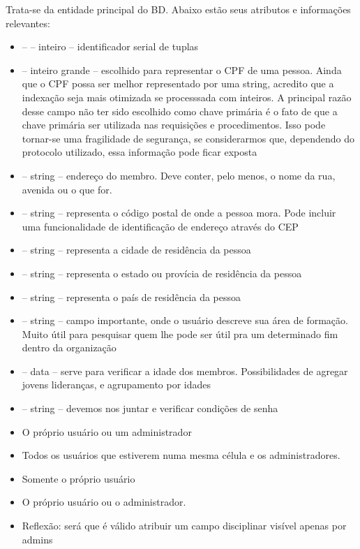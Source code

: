 \documentclass[11pt]{article}
\begin{document}
            Trata-se da entidade principal do BD. Abaixo estão seus atributos e informações
            relevantes:
            \begin{itemize}
                \item \pk --  -- inteiro -- identificador serial de tuplas
                \item {} -- inteiro grande -- escolhido para representar o CPF
                de uma pessoa. Ainda que o CPF possa ser melhor representado por uma string,
                acredito que a indexação seja mais otimizada se processsada com inteiros.
                A principal razão desse campo não ter sido escolhido como chave primária
                é o fato de que a chave primária ser utilizada nas requisições e procedimentos.
                Isso pode tornar-se uma fragilidade de segurança, se considerarmos que, dependendo
                do protocolo utilizado, essa informação pode ficar exposta
                \item {} -- string -- endereço do membro. Deve conter, pelo
                menos, o nome da rua, avenida ou o que for.
                \item {} -- string -- representa o código postal de onde a pessoa
                mora. Pode incluir uma funcionalidade de identificação de endereço através do CEP
                \item {} -- string -- representa a cidade de residência da pessoa
                \item {} -- string -- representa o estado ou provícia de residência
                da pessoa
                \item {} -- string -- representa o país de residência da pessoa
                \item {} -- string -- campo importante, onde o usuário
                descreve sua área de formação. Muito útil para pesquisar quem lhe pode ser
                útil pra um determinado fim dentro da organização
                \item {} -- data -- serve para verificar a idade dos membros.
                Possibilidades de agregar jovens lideranças, e agrupamento por idades
                \item {} -- string -- devemos nos juntar e verificar condições de senha
                \item \criar O próprio usuário ou um administrador
                \item \ler Todos os usuários que estiverem numa mesma
                célula e os administradores.
                \item \atualizar Somente o próprio usuário
                \item \deletar O próprio usuário ou o administrador.
                \item Reflexão: será que é válido atribuir um campo disciplinar visível apenas por
                admins
            \end{itemize}
\end{document}
